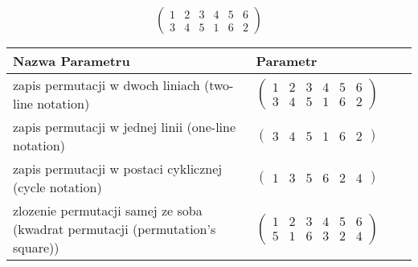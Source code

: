 \documentclass[12pt]{article}
\begin{document}
\subsection{}
\begin{center}
\[
\begin{pmatrix}
	1 & 2 & 3 & 4 & 5 & 6 \\ 
	3 & 4 & 5 & 1 & 6 & 2 
\end{pmatrix}
\]

\begin{tabular}{|m{0.6\linewidth}|m{0.4\linewidth}|}
	\hline
	Nazwa Parametru & Parametr \\
	\hline
	zapis permutacji w dwoch liniach (two-line notation) & $\begin{pmatrix} 1 & 2 & 3 & 4 & 5 & 6 \\ 
3 & 4 & 5 & 1 & 6 & 2 \end{pmatrix}$ \\ 
	\hline
	zapis permutacji w jednej linii (one-line notation) & $\begin{pmatrix} 3 & 4 & 5 & 1 & 6 & 2 \end{pmatrix}$ \\ 
	\hline
	zapis permutacji w postaci cyklicznej (cycle notation) & $\begin{pmatrix} 1 & 3 & 5 & 6 & 2 & 4 \end{pmatrix} $ \\ 
	\hline
	zlozenie permutacji samej ze soba (kwadrat permutacji (permutation's square)) & $\begin{pmatrix} 1 & 2 & 3 & 4 & 5 & 6 \\ 
5 & 1 & 6 & 3 & 2 & 4 \end{pmatrix}$ \\ 
	\hline
\end{tabular}
\end{center}
\end{document}
